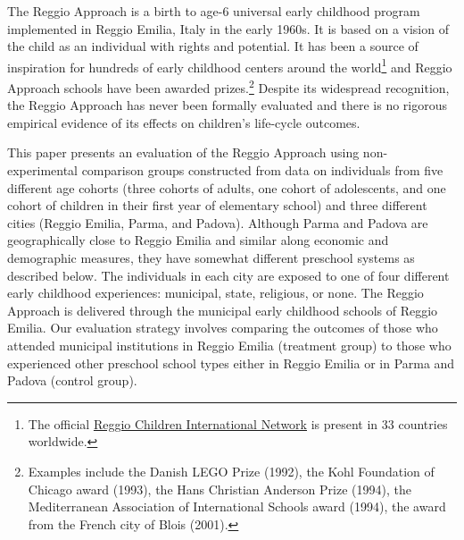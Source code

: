 The Reggio Approach is a birth to age-6 universal early childhood program implemented in Reggio Emilia, Italy in the early 1960s. It is based on a vision of the child as an individual with rights and potential. It has been a source of inspiration for hundreds of early childhood centers around the world\footnote{The official \href{http://www.reggiochildren.it/network/?lang=en}{Reggio Children International Network} is present in 33 countries worldwide.} and Reggio Approach schools have been awarded prizes.\footnote{Examples include the Danish LEGO Prize (1992), the Kohl Foundation of Chicago award (1993), the Hans Christian Anderson Prize (1994), the Mediterranean Association of International Schools award (1994), the award from the French city of Blois (2001).} Despite its widespread recognition, the Reggio Approach has never been formally evaluated and there is no rigorous empirical evidence of its effects on children's life-cycle outcomes.

This paper presents an evaluation of the Reggio Approach using non-experimental comparison groups constructed from data on individuals from five different age cohorts (three cohorts of adults, one cohort of adolescents, and one cohort of children in their first year of elementary school) and three different cities (Reggio Emilia, Parma, and Padova). Although Parma and Padova are geographically close to Reggio Emilia and similar along economic and demographic measures, they have somewhat different preschool systems as described below. The individuals in each city are exposed to one of four different early childhood experiences: municipal, state, religious, or none. The Reggio Approach is delivered through the municipal early childhood schools of Reggio Emilia. Our evaluation strategy involves comparing the outcomes of those who attended municipal institutions in Reggio Emilia (treatment group) to those who experienced other preschool school types either in Reggio Emilia or in Parma and Padova (control group).


